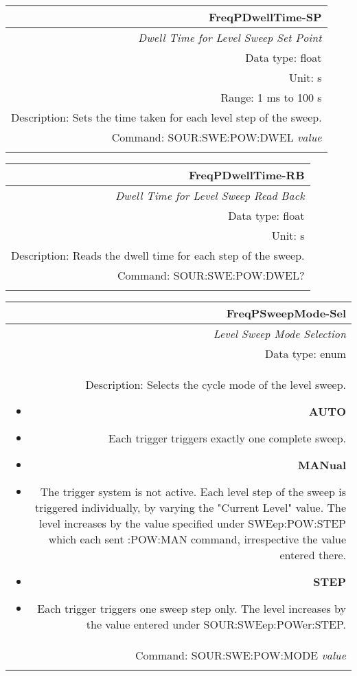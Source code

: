 \documentclass[openany]{article}
\begin{document}
		\begin{tabular}{N}
			\hline
			\bfseries FreqPDwellTime-SP \\ \hline
			\emph{Dwell Time for Level Sweep Set Point} \\
			Data type: float \\
			Unit: s \\
			Range: 1 ms to 100 s \\
			Description: Sets the time taken for each level step of the sweep. \\
			Command: SOUR:SWE:POW:DWEL \emph{value} \\
			\\
			
		\end{tabular}


		\begin{tabular}{N}
			\hline
			\bfseries FreqPDwellTime-RB \\ \hline
			\emph{Dwell Time for Level Sweep Read Back} \\
			Data type: float \\
			Unit: s \\
			Description: Reads the dwell time for each step of the sweep. \\
			Command: SOUR:SWE:POW:DWEL? \\
			\\

		\end{tabular}


		\begin{tabular}{N}
			\hline
			\bfseries FreqPSweepMode-Sel \\ \hline
			\emph{Level Sweep Mode Selection} \\
			Data type: enum \\
			Description: Selects the cycle mode of the level sweep.\begin{itemize}[noitemsep]
				\small
				\item[] \textbf{AUTO}
				\item[] Each trigger triggers exactly one complete sweep.
				\item[] \textbf{MANual}
				\item[] The trigger system is not active. Each level step of the sweep is triggered individually, by varying the "Current Level" value. The level increases by the value specified under SWEep:POW:STEP which each sent :POW:MAN command, irrespective the value entered there.
				\item[] \textbf{STEP}
				\item[] Each trigger triggers one sweep step only. The level increases by the value entered under SOUR:SWEep:POWer:STEP.
			\end{itemize} \\
			Command: SOUR:SWE:POW:MODE \emph{value} \\
			\\

		\end{tabular}
\end{document}
